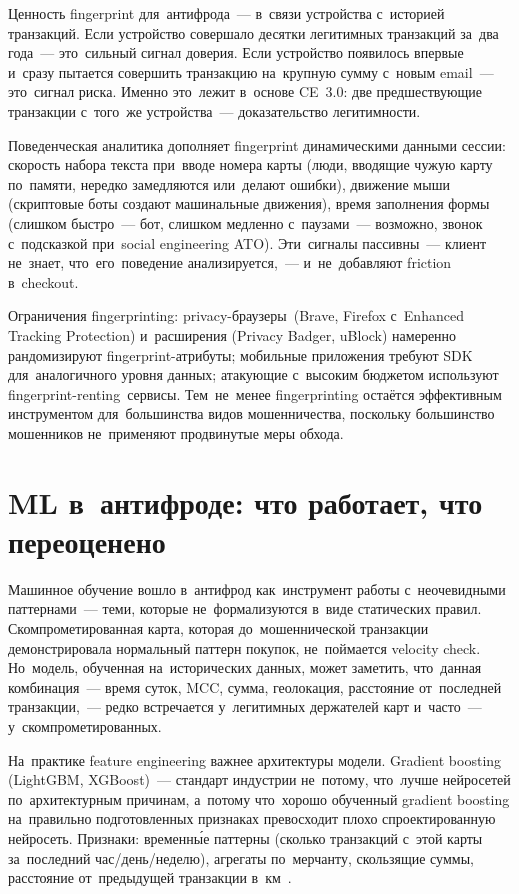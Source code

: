 Ценность fingerprint для~антифрода~--- в~связи устройства с~историей
транзакций. Если устройство совершало десятки легитимных транзакций
за~два года~--- это~сильный сигнал доверия. Если устройство появилось
впервые и~сразу пытается совершить транзакцию на~крупную сумму с~новым
email~--- это~сигнал риска. Именно это~лежит в~основе CE~3.0: две
предшествующие транзакции с~того~же устройства~--- доказательство
легитимности.

Поведенческая аналитика дополняет fingerprint динамическими данными
сессии: скорость набора текста при~вводе номера карты (люди, вводящие
чужую карту по~памяти, нередко замедляются или~делают ошибки), движение
мыши (скриптовые боты создают машинальные движения), время заполнения
формы (слишком быстро~--- бот, слишком медленно с~паузами~---
возможно, звонок с~подсказкой при~social engineering ATO). Эти~сигналы
пассивны~--- клиент не~знает, что~его~поведение анализируется,~---
и~не~добавляют friction в~checkout.

Ограничения fingerprinting: privacy-браузеры~(Brave, Firefox с~Enhanced
Tracking Protection) и~расширения (Privacy Badger, uBlock) намеренно
рандомизируют fingerprint-атрибуты; мобильные приложения требуют SDK
для~аналогичного уровня данных; атакующие с~высоким бюджетом используют
fingerprint-renting~сервисы. Тем~не~менее fingerprinting остаётся
эффективным инструментом для~большинства видов мошенничества, поскольку
большинство мошенников не~применяют продвинутые меры обхода.


\section{ML в~антифроде: что работает, что переоценено}
\label{sec:fraud-ml}

Машинное обучение вошло в~антифрод как~инструмент работы с~неочевидными
паттернами~--- теми, которые не~формализуются в~виде статических правил.
Скомпрометированная карта, которая до~мошеннической транзакции демонстрировала
нормальный паттерн покупок, не~поймается velocity check. Но~модель,
обученная на~исторических данных, может заметить, что~данная комбинация~---
время суток, MCC, сумма, геолокация, расстояние от~последней транзакции,~---
редко встречается у~легитимных держателей карт и~часто~--- у~скомпрометированных.

На~практике feature engineering важнее архитектуры модели. Gradient boosting
(LightGBM, XGBoost)~--- стандарт индустрии не~потому, что~лучше нейросетей
по~архитектурным причинам, а~потому что~хорошо обученный gradient boosting
на~правильно подготовленных признаках превосходит плохо спроектированную
нейросеть. Признаки: временны́е паттерны (сколько транзакций с~этой
карты за~последний час/день/неделю), агрегаты по~мерчанту, скользящие
суммы, расстояние от~предыдущей транзакции в~км~.

